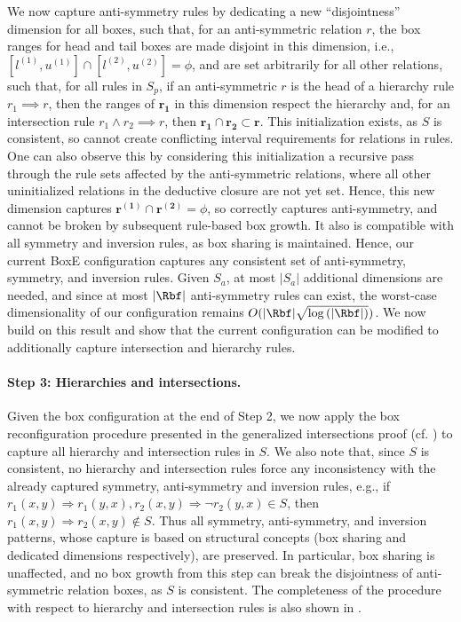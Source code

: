 \documentclass{article}
\begin{document}
We now capture anti-symmetry rules by dedicating a new ``disjointness'' dimension for all boxes, such that, for an anti-symmetric relation $r$, the box ranges for head and tail boxes are made disjoint in this dimension, i.e., $[l^{(1)},u^{(1)}] \cap [l^{(2)},u^{(2)}] = \phi$, and are set arbitrarily for all other relations, such that, for all rules in $S_p$, if an anti-symmetric $r$ is the head of a hierarchy rule $r_1 \implies r$, then the ranges of $\bm{r_1}$ in this dimension respect the hierarchy and, for an intersection rule $r_1 \land r_2 \implies r$, then $\bm{r_1} \cap \bm{r_2} \subset \bm{r}$. This initialization exists, as $S$ is consistent, so cannot create conflicting interval requirements for relations in rules. One can also observe this by considering this initialization a recursive pass through the rule sets affected by the anti-symmetric relations, where all other uninitialized relations in the deductive closure are not yet set. Hence, this new dimension captures $\bm{r^{(1)}} \cap \bm{r^{(2)}} = \phi$, so correctly captures anti-symmetry, and cannot be broken by subsequent rule-based box growth. It also is compatible with all symmetry and inversion rules, as box sharing is maintained. Hence, our current BoxE configuration captures any consistent set of anti-symmetry, symmetry, and inversion rules. Given $S_a$, at most $|S_a|$ additional dimensions are needed, and since at most $|\Rbf|$ anti-symmetry rules can exist, the worst-case dimensionality of our configuration remains ${O(|\Rbf|\sqrt{\log{(|\Rbf|)}})}$.
We now build on this result and show that the current configuration can be modified to additionally capture intersection and hierarchy rules.

\paragraph{Step 3: Hierarchies and intersections.} Given the box configuration at the end of Step 2, we now apply the box reconfiguration procedure presented in the generalized intersections proof (cf. ) to capture all hierarchy and intersection rules in $S$. We also note that, since $S$ is consistent, no hierarchy and intersection rules force any inconsistency with the already captured symmetry, anti-symmetry and inversion rules, e.g., if $r_1(x,y) \Rightarrow r_1(y,x), r_2(x,y) \Rightarrow \neg r_2(y,x) \in S$, then $r_1(x,y) \Rightarrow r_2(x,y) \notin S$. Thus all symmetry, anti-symmetry, and inversion patterns, whose capture is based on structural concepts (box sharing and dedicated dimensions respectively), are preserved. In particular, box sharing is unaffected, and no box growth from this step can break the disjointness of anti-symmetric relation boxes, as $S$ is consistent. The completeness of the procedure with respect to hierarchy and intersection rules is also shown in .
\end{document}
